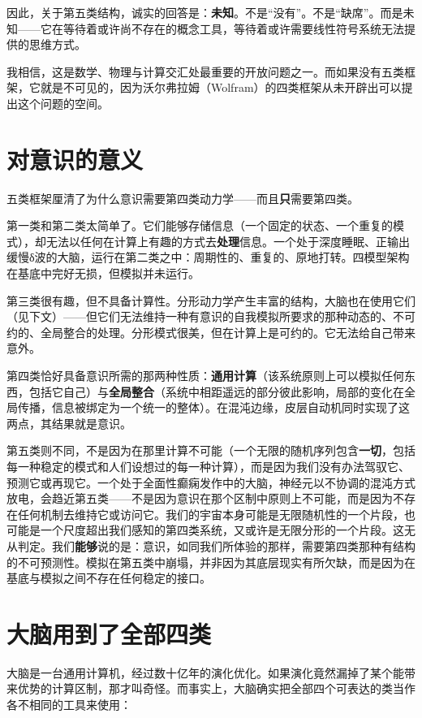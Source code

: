 \documentclass[11pt, twoside, openright]{book}
\begin{document}
因此，关于第五类结构，诚实的回答是：\textbf{未知}。不是“没有”。不是“缺席”。而是未知------它在等待着或许尚不存在的概念工具，等待着或许需要线性符号系统无法提供的思维方式。

我相信，这是数学、物理与计算交汇处最重要的开放问题之一。而如果没有五类框架，它就是不可见的，因为沃尔弗拉姆（Wolfram）的四类框架从未开辟出可以提出这个问题的空间。

\section*{对意识的意义}

五类框架厘清了为什么意识需要第四类动力学------而且\textbf{只}需要第四类。

第一类和第二类太简单了。它们能够存储信息（一个固定的状态、一个重复的模式），却无法以任何在计算上有趣的方式去\textbf{处理}信息。一个处于深度睡眠、正输出缓慢δ波的大脑，运行在第二类之中：周期性的、重复的、原地打转。四模型架构在基底中完好无损，但模拟并未运行。

第三类很有趣，但不具备计算性。分形动力学产生丰富的结构，大脑也在使用它们（见下文）------但它们无法维持一种有意识的自我模拟所要求的那种动态的、不可约的、全局整合的处理。分形模式很美，但在计算上是可约的。它无法给自己带来意外。

第四类恰好具备意识所需的那两种性质：\textbf{通用计算}（该系统原则上可以模拟任何东西，包括它自己）与\textbf{全局整合}（系统中相距遥远的部分彼此影响，局部的变化在全局传播，信息被绑定为一个统一的整体）。在混沌边缘，皮层自动机同时实现了这两点，其结果就是意识。

第五类则不同，不是因为在那里计算不可能（一个无限的随机序列包含\textbf{一切}，包括每一种稳定的模式和人们设想过的每一种计算），而是因为我们没有办法驾驭它、预测它或再现它。一个处于全面性癫痫发作中的大脑，神经元以不协调的混沌方式放电，会趋近第五类------不是因为意识在那个区制中原则上不可能，而是因为不存在任何机制去维持它或访问它。我们的宇宙本身可能是无限随机性的一个片段，也可能是一个尺度超出我们感知的第四类系统，又或许是无限分形的一个片段。这无从判定。我们\textbf{能够}说的是：意识，如同我们所体验的那样，需要第四类那种有结构的不可预测性。模拟在第五类中崩塌，并非因为其底层现实有所欠缺，而是因为在基底与模拟之间不存在任何稳定的接口。

\section*{大脑用到了全部四类}

大脑是一台通用计算机，经过数十亿年的演化优化。如果演化竟然漏掉了某个能带来优势的计算区制，那才叫奇怪。而事实上，大脑确实把全部四个可表达的类当作各不相同的工具来使用：
\end{document}
